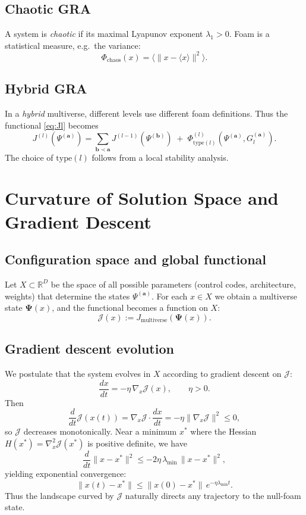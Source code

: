 \documentclass[12pt,a4paper]{article}
\newcommand{\JJ}{\mathcal{J}}
\newcommand{\RR}{\mathbb{R}}
\begin{document}
\subsection{Chaotic GRA}
A system is \emph{chaotic} if its maximal Lyapunov exponent $\lambda_1>0$. Foam is a statistical measure, e.g.\ the variance:
\begin{equation}
\Phi_{\text{chaos}}(x) = \langle \|x - \langle x\rangle\|^2 \rangle.
\end{equation}

\subsection{Hybrid GRA}
In a \emph{hybrid} multiverse, different levels use different foam definitions. Thus the functional \eqref{eq:Jl} becomes
\begin{equation}
J^{(l)}(\Psi^{(\mathbf{a})}) = \sum_{\mathbf{b}\prec\mathbf{a}} J^{(l-1)}(\Psi^{(\mathbf{b})}) \;+\; \Phi^{(l)}_{\text{type}(l)}(\Psi^{(\mathbf{a})}, G_l^{(\mathbf{a})}).
\end{equation}
The choice of $\text{type}(l)$ follows from a local stability analysis.

\section{Curvature of Solution Space and Gradient Descent}

\subsection{Configuration space and global functional}
Let $X\subset\RR^D$ be the space of all possible parameters (control codes, architecture, weights) that determine the states $\Psi^{(\mathbf{a})}$. For each $x\in X$ we obtain a multiverse state $\mathbf{\Psi}(x)$, and the functional becomes a function on $X$:
\begin{equation}
\JJ(x) := J_{\text{multiverse}}(\mathbf{\Psi}(x)).
\end{equation}

\subsection{Gradient descent evolution}
We postulate that the system evolves in $X$ according to gradient descent on $\JJ$:
\begin{equation}\label{eq:gradflow}
\frac{dx}{dt} = -\eta\, \nabla_x \JJ(x), \qquad \eta>0.
\end{equation}
Then
\[
\frac{d}{dt}\JJ(x(t)) = \nabla_x\JJ \cdot \frac{dx}{dt} = -\eta\|\nabla_x\JJ\|^2 \le 0,
\]
so $\JJ$ decreases monotonically. Near a minimum $x^*$ where the Hessian $H(x^*)=\nabla_x^2\JJ(x^*)$ is positive definite, we have
\[
\frac{d}{dt}\|x-x^*\|^2 \le -2\eta\,\lambda_{\min}\,\|x-x^*\|^2,
\]
yielding exponential convergence:
\[
\|x(t)-x^*\| \le \|x(0)-x^*\|\, e^{-\eta\lambda_{\min}t}.
\]
Thus the landscape curved by $\JJ$ naturally directs any trajectory to the null-foam state.
\end{document}
